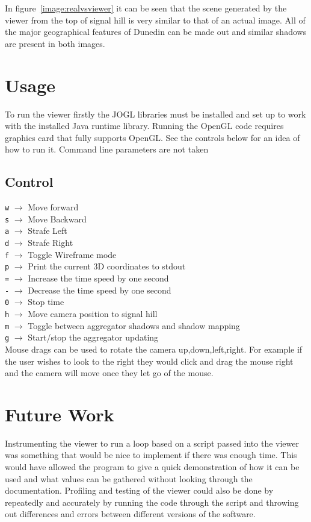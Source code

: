 \documentclass[12pt]{report}
\begin{document}
In figure~\ref{image:realvsviewer} it can be seen that the scene generated by the viewer from the top of signal hill is very similar to that of an actual image. All of the major geographical features of Dunedin can be made out and similar shadows are present in both images.

\section{Usage}
To run the viewer firstly the JOGL libraries must be installed and set up to work with the installed Java runtime library. Running the OpenGL code requires graphics card that fully supports OpenGL. See the controls below for an idea of how to run it. Command line parameters are not taken
\subsection{Control}
\texttt{w} $\rightarrow$ Move forward\\
\texttt{s} $\rightarrow$ Move Backward\\
\texttt{a} $\rightarrow$ Strafe Left\\
\texttt{d} $\rightarrow$ Strafe Right\\
\texttt{f} $\rightarrow$ Toggle Wireframe mode\\
\texttt{p} $\rightarrow$ Print the current 3D coordinates to stdout\\
\texttt{=} $\rightarrow$ Increase the time speed by one second\\
\texttt{-} $\rightarrow$ Decrease the time speed by one second\\
\texttt{0} $\rightarrow$ Stop time\\
\texttt{h} $\rightarrow$ Move camera position to signal hill\\
\texttt{m} $\rightarrow$ Toggle between aggregator shadows and shadow mapping\\
\texttt{g} $\rightarrow$ Start/stop the aggregator updating\\

Mouse drags can be used to rotate the camera up,down,left,right. For example if the user wishes to look to the right they would click and drag the mouse right and the camera will move once they let go of the mouse.\\

\section{Future Work}
Instrumenting the viewer to run a loop based on a script passed into the viewer was something that would be nice to implement if there was enough time. This would have allowed the program to give a quick demonstration of how it can be used and what values can be gathered without looking through the documentation. Profiling and testing of the viewer could also be done by repeatedly and accurately by running the code through the script and throwing out differences and errors between different versions of the software.\\
\end{document}
